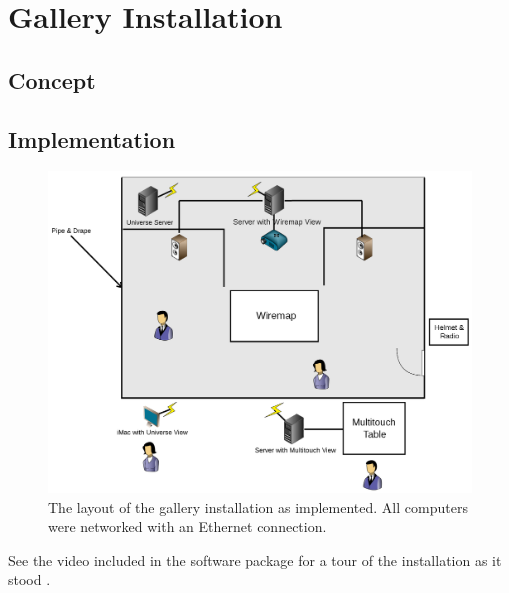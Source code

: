 \chapter{Gallery Installation}

\section{Concept}

\section{Implementation}

\begin{figure}[htp]\centering
\includegraphics[width=.99\textwidth]{images/gallery_installation.png}
  \caption{The layout of the gallery installation as implemented. All computers were networked with an Ethernet connection.}\label{fig:gallery}
\end{figure}

See the video included in the software package for a tour of the installation as it stood \cite{PACK}.
